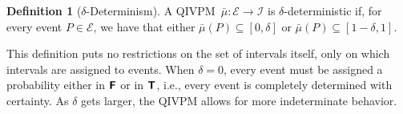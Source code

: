 \documentclass[english,reprint, aps, prl,superscriptaddress, showpacs,
showkeys, longbibliography, amsmath, amssymb, floatfix]{revtex4-1}
\theoremstyle{plain}
\theoremstyle{definition}
\newtheorem{definition}{Definition}
\newcommand{\events}{\ensuremath{\mathcal{E}}}
\newcommand{\interval}[1]{{\normalfont\textsf{\textbf{#1}}}}
\newcommand{\imposs}{\interval{F}}
\newcommand{\necess}{\interval{T}}
\newcommand{\unknown}{\interval{U}}
\newcommand{\proj}[1]{\op{#1}{#1}}
\newcommand{\says}[3]{\begin{framed}\begin{minipage}{0.9\linewidth}\color{#1}{#2 says: #3}\end{minipage}\end{framed}}
\newcommand{\yutsung}[1]{\says{purple}{Yu-Tsung}{#1}}
\begin{document}
\begin{definition}[$\delta$-Determinism]\label{def:delta-deterministic} A
  QIVPM~$\bar{\mu}:\events\rightarrow\mathscr{I}$ is
  $\delta$-deterministic if, for every event $P\in\events$, we have
  that either 
  $\bar{\mu}\left(P\right)\subseteq\left[0,\delta\right]$ or
  $\bar{\mu}\left(P\right)\subseteq\left[1-\delta,1\right]$. 
\end{definition}


\noindent This definition puts no restrictions on the set of intervals
itself, only on which intervals are assigned to events. When
$\delta=0$, every event must be assigned a probability either in
$\imposs$ or in $\necess$, i.e., every event is completely determined
with certainty. As $\delta$ gets larger, the QIVPM allows for more
indeterminate behavior. %
\end{document}
